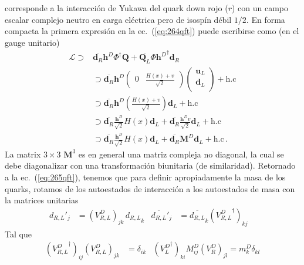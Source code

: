 \begin{frame}
corresponde a la interacción de Yukawa del quark down rojo ($r$) con un campo escalar complejo neutro en carga eléctrica pero de isospín débil $1/2$. En forma compacta la primera expresión en la ec.~(\ref{eq:264qft}) puede escribirse como (en el gauge unitario)
\begin{align}
  \mathcal{L}\supset&\overline{\mathbf{d}_R} \mathbf{h}^D \Phi^\dagger \mathbf{Q}+\overline{\mathbf{Q}_L}\Phi{\mathbf{h}^{D}}^\dagger  \mathbf{d}_R\nonumber\\
  &\supset\overline{\mathbf{d}_R} \mathbf{h}^D
  \begin{pmatrix}
    0 &
    \frac{H(x)+v}{\sqrt{2}}
  \end{pmatrix}
  \begin{pmatrix}
    \mathbf{u}_L\\
    \mathbf{d}_L\\
  \end{pmatrix}
  +\text{h.c}\nonumber\\
  &\supset\overline{\mathbf{d}_R} \mathbf{h}^D
  \left(\frac{H(x)+v}{\sqrt{2}}\right)\mathbf{d}_L
  +\text{h.c}\nonumber\\
  &\supset\overline{\mathbf{d}_R} \frac{\mathbf{h}^D}{\sqrt{2}}H(x)\mathbf{d}_L
  +\overline{\mathbf{d}_R} \frac{\mathbf{h}^Dv}{\sqrt{2}}\mathbf{d}_L
      +\text{h.c}\nonumber\\
  &\supset\overline{\mathbf{d}_R} \frac{\mathbf{h}^D}{\sqrt{2}}H(x)\mathbf{d}_L
  +\overline{\mathbf{d}_R} \mathbf{M}^D\mathbf{d}_L
      +\text{h.c}\,.
\end{align}
La matrix $3\times 3$ $\mathbf{M}^3$ es en general una matriz compleja no diagonal, la cual se debe diagonalizar con una transformación biunitaria (de similaridad).
Retornado a la ec.~(\ref{eq:265qft}), tenemos que para definir apropiadamente la masa de los quarks, rotamos de los autoestados de interacción a los autoestados de masa con la matrices unitarias
\begin{align}
  \label{eq:229qft}
  {d_{R,L}}'_j&=(V^D_{R,L})_{jk}\, {d_{R,L}}_k&   \overline{d_{R,L}}'_j&=\overline{d_{R,L}}_k({V^D_{R,L}}^\dagger)_{kj}\,&
\end{align}
Tal que
\begin{align}
  ({V^D_{R,L}}^\dagger)_{ij}(V^D_{R,L})_{jk}&=\delta_{ik}& ({V^D_L}^\dagger)_{ki}M^D_{ij}(V^D_R)_{jl}=m^D_k\delta_{kl}
\end{align}


\end{frame}
